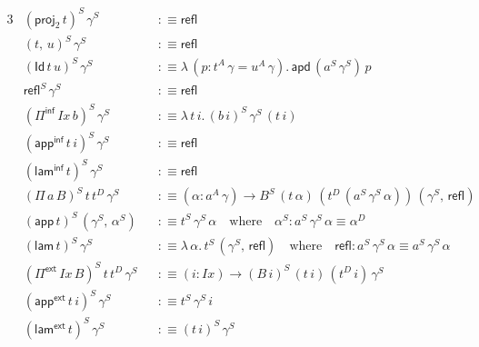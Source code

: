 \documentclass[12pt,a4paper,twoside,openany]{book}
\theoremstyle{remark}
\theoremstyle{definition}
\theoremstyle{theorem}
\newcommand{\mi}[1]{\mathit{#1}}
\newcommand{\ms}[1]{\mathsf{#1}}
\newcommand{\apd}{\ms{apd}}
\newcommand{\refl}{\mathsf{refl}}
\newcommand{\Id}{\mathsf{Id}}
\newcommand{\proj}{\mathsf{proj}}
\newcommand{\Pie}{\Pi^{\mathsf{ext}}}
\newcommand{\appe}{\mathsf{app^{ext}}}
\newcommand{\lame}{\mathsf{lam^{ext}}}
\newcommand{\Piinf}{\Pi^{\mathsf{inf}}}
\newcommand{\appinf}{\mathsf{app^{inf}}}
\newcommand{\laminf}{\mathsf{lam^{inf}}}
\newcommand{\app}{\ms{app}}
\newcommand{\lam}{\ms{lam}}
\newcommand{\defn}{:\equiv}
\begin{document}
\begin{alignat*}{3}
  &(\proj_2\,t)^S\,\gamma^S &&\defn \refl\\
  &(t,\,u)^S\,\gamma^S &&\defn \refl \\
  &(\Id\,t\,u)^S\,\gamma^S &&\defn \lambda\,(p : t^A\,\gamma = u^A\,\gamma).\,\apd\,(a^S\,\gamma^S)\,p\\
  &\refl^S\,\gamma^S &&\defn \refl\\
  &(\Piinf\,\mi{Ix}\,b)^S\,\gamma^S &&\defn \lambda\,t\,i.\,(b\,i)^S\,\gamma^S\,(t\,i)\\
  &(\appinf\,t\,i)^S\,\gamma^S &&\defn \refl \\
  &(\laminf\,t)^S\,\gamma^S &&\defn \refl \\
  &(\Pi\,a\,B)^S\,t\,t^D\,\gamma^S &&\defn (\alpha : a^A\,\gamma) \to B^S\,(t\,\alpha)\,(t^D\,(a^S\,\gamma^S\,\alpha))\,(\gamma^S,\,\refl)\\
  &(\app\,t)^S\,(\gamma^S,\,\alpha^S) &&\defn t^S\,\gamma^S\,\alpha\hspace{1em}\text{where}\hspace{1em} \alpha^S : a^S\,\gamma^S\,\alpha \equiv \alpha^D\\
  &(\lam\,t)^S\,\gamma^S &&\defn \lambda\,\alpha.\,t^S\,(\gamma^S,\,\refl)\hspace{1em}\text{where}\hspace{1em} \refl : a^S\,\gamma^S\,\alpha \equiv a^S\,\gamma^S\,\alpha\\
  &(\Pie\,\mi{Ix}\,B)^S\,t\,t^D\,\gamma^S &&\defn (i : \mi{Ix}) \to (B\,i)^S\,(t\,i)\,(t^D\,i)\,\gamma^S\\
  &(\appe\,t\,i)^S\,\gamma^S &&\defn t^S\,\gamma^S\,i\\
  &(\lame\,t)^S\,\gamma^S &&\defn (t\,i)^S\,\gamma^S
\end{alignat*}

\backmatter

\end{document}
